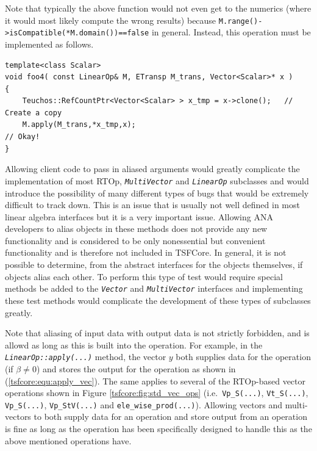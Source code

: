 \noindent Note that typically the above function would not even get to the numerics
(where it would most likely compute the wrong results) because
\texttt{M.range()->isCompatible(*M.domain())==false} in general.
Instead, this operation must be implemented as follows.

{\scriptsize\begin{verbatim}
template<class Scalar>
void foo4( const LinearOp& M, ETransp M_trans, Vector<Scalar>* x )
{
    Teuchos::RefCountPtr<Vector<Scalar> > x_tmp = x->clone();   // Create a copy
    M.apply(M_trans,*x_tmp,x);                                       // Okay!
}
\end{verbatim}}

\noindent Allowing client code to pass in aliased arguments would greatly
complicate the implementation of most RTOp,
\texttt{\textit{Multi\-Vector}} and \texttt{\textit{LinearOp}}
subclasses and would introduce the possibility of many different types
of bugs that would be extremely difficult to track down.  This is an
issue that is usually not well defined in most linear algebra
interfaces but it is a very important issue.  Allowing ANA developers
to alias objects in these methods does not provide any new
functionality and is considered to be only nonessential but convenient
functionality and is therefore not included in TSFCore.  In general,
it is not possible to determine, from the abstract interfaces for the
objects themselves, if objects alias each other.  To perform this type
of test would require special methods be added to the
\texttt{\textit{Vector}} and
\texttt{\textit{Multi\-Vector}} interfaces and implementing these test
methods would complicate the development of these types of subclasses
greatly.

Note that aliasing of input data with output data is not strictly
forbidden, and is allowd as long as this is built into the operation.
For example, in the \texttt{\textit{LinearOp\-::apply(\-...)}} method,
the vector $y$ both supplies data for the operation (if $\beta \ne 0$)
and stores the output for the operation as shown in
(\ref{tsfcore:equ:apply_vec}).  The same applies to several of the
RTOp-based vector operations shown in Figure
\ref{tsfcore:fig:std_vec_ops} (i.e.~\texttt{Vp\_S(...)},
\texttt{Vt\_S(...)}, \texttt{Vp\_S(...)}, \texttt{Vp\_StV(...)}
and \texttt{ele\_wise\_prod(...)}).  Allowing vectors and
multi-vectors to both supply data for an operation and store output
from an operation is fine as long as the operation has been
specifically designed to handle this as the above mentioned operations
have.

